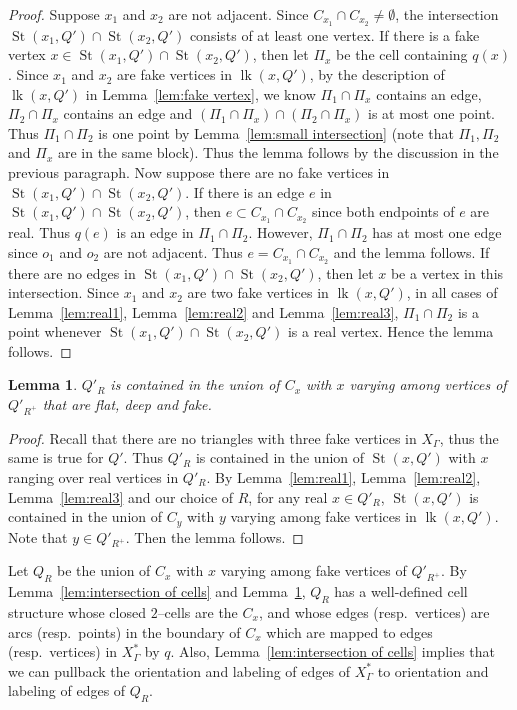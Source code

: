 \documentclass[11pt]{amsart}
\newcommand{\lk}{\operatorname{lk}}
\newcommand{\St}{\operatorname{St}}
\newtheorem{lemma}[theorem]{Lemma}
\theoremstyle{definition}
\newcommand{\Xa}{X^{\ast}}
\begin{document}
\begin{proof}
Suppose $x_1$ and $x_2$ are not adjacent. Since $C_{x_1}\cap C_{x_2}\neq\emptyset$, the intersection $\St(x_1,Q')\cap\St(x_2,Q')$ consists of at least one vertex. If there is a fake vertex $x\in\St(x_1,Q')\cap\St(x_2,Q')$, then let $\Pi_x$ be the cell containing $q(x)$. Since $x_1$ and $x_2$ are fake vertices in $\lk(x,Q')$, by the description of $\lk(x,Q')$ in Lemma~\ref{lem:fake vertex}, we know $\Pi_1\cap\Pi_x$ contains an edge, $\Pi_2\cap\Pi_x$ contains an edge and $(\Pi_1\cap\Pi_x)\cap(\Pi_2\cap\Pi_x)$ is at most one point. Thus $\Pi_1\cap\Pi_2$ is one point by Lemma~\ref{lem:small intersection} (note that $\Pi_1,\Pi_2$ and $\Pi_x$ are in the same block). Thus the lemma follows by the discussion in the previous paragraph. Now suppose there are no fake vertices in $\St(x_1,Q')\cap\St(x_2,Q')$. If there is an edge $e$ in $\St(x_1,Q')\cap\St(x_2,Q')$, then $e\subset C_{x_1}\cap C_{x_2}$ since both endpoints of $e$ are real. Thus $q(e)$ is an edge in $\Pi_1\cap\Pi_2$. However, $\Pi_1\cap\Pi_2$ has at most one edge since $o_1$ and $o_2$ are not adjacent. Thus $e= C_{x_1}\cap C_{x_2}$ and the lemma follows. If there are no edges in $\St(x_1,Q')\cap\St(x_2,Q')$, then let $x$ be a vertex in this intersection. Since $x_1$ and $x_2$ are two fake vertices in $\lk(x,Q')$, in all cases of Lemma~\ref{lem:real1}, Lemma~\ref{lem:real2} and Lemma~\ref{lem:real3}, $\Pi_1\cap\Pi_2$ is a point whenever $\St(x_1,Q')\cap\St(x_2,Q')$ is a real vertex. Hence the lemma follows.
\end{proof}


\begin{lemma}
	\label{lem:cover}
$Q'_R$ is contained in the union of $C_x$ with $x$ varying among vertices of $Q'_{R^+}$ that are flat, deep and fake.
\end{lemma}

\begin{proof}
Recall that there are no triangles with three fake vertices in $X_\Gamma$, thus the same is true for $Q'$. Thus $Q'_R$ is contained in the union of $\St(x,Q')$ with $x$ ranging over real vertices in $Q'_R$. By Lemma~\ref{lem:real1}, Lemma~\ref{lem:real2}, Lemma~\ref{lem:real3} and our choice of $R$, for any real $x\in Q'_R$, $\St(x,Q')$ is contained in the union of $C_y$ with $y$ varying among fake vertices in $\lk(x,Q')$. Note that $y\in Q'_{R^+}$. Then the lemma follows.
\end{proof}

Let $Q_R$ be the union of $C_x$ with $x$ varying among fake vertices of $Q'_{R^+}$. By Lemma~\ref{lem:intersection of cells} and Lemma~\ref{lem:cover}, $Q_R$ has a well-defined cell structure whose closed $2$--cells are the $C_x$, and whose edges (resp.\ vertices) are arcs (resp.\ points) in the boundary of $C_x$ which are mapped to edges (resp.\ vertices) in $\Xa_\Gamma$ by $q$. Also, Lemma~\ref{lem:intersection of cells} implies that we can pullback the orientation and labeling of edges of $\Xa_\Gamma$ to orientation and labeling of edges of $Q_R$. 
\end{document}
